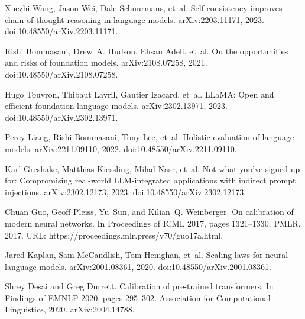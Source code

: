 \documentclass[10pt]{article}
\begin{document}
\begin{thebibliography}{99}
Xuezhi Wang, Jason Wei, Dale Schuurmans, et~al.
\newblock Self-consistency improves chain of thought reasoning in language models.
\newblock arXiv:2203.11171, 2023.
\newblock doi:10.48550/arXiv.2203.11171.

Rishi Bommasani, Drew~A. Hudson, Ehsan Adeli, et~al.
\newblock On the opportunities and risks of foundation models.
\newblock arXiv:2108.07258, 2021.
\newblock doi:10.48550/arXiv.2108.07258.

Hugo Touvron, Thibaut Lavril, Gautier Izacard, et~al.
\newblock LLaMA: Open and efficient foundation language models.
\newblock arXiv:2302.13971, 2023.
\newblock doi:10.48550/arXiv.2302.13971.

Percy Liang, Rishi Bommasani, Tony Lee, et~al.
\newblock Holistic evaluation of language models.
\newblock arXiv:2211.09110, 2022.
\newblock doi:10.48550/arXiv.2211.09110.

Karl Greshake, Matthias Kiessling, Milad Nasr, et~al.
\newblock Not what you've signed up for: Compromising real-world LLM-integrated applications with indirect prompt injections.
\newblock arXiv:2302.12173, 2023.
\newblock doi:10.48550/arXiv.2302.12173.

Chuan Guo, Geoff Pleiss, Yu~Sun, and Kilian~Q. Weinberger.
\newblock On calibration of modern neural networks.
\newblock In Proceedings of ICML 2017, pages 1321--1330. PMLR, 2017.
\newblock URL: https://proceedings.mlr.press/v70/guo17a.html.

Jared Kaplan, Sam McCandlish, Tom Henighan, et~al.
\newblock Scaling laws for neural language models.
\newblock arXiv:2001.08361, 2020.
\newblock doi:10.48550/arXiv.2001.08361.

Shrey Desai and Greg Durrett.
\newblock Calibration of pre-trained transformers.
\newblock In Findings of EMNLP 2020, pages 295--302. Association for Computational Linguistics, 2020.
\newblock arXiv:2004.14788.


\end{thebibliography}
\end{document}
